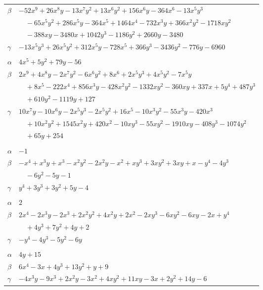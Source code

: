 \documentclass[11pt]{article}
\begin{document}
\begin{longtable}{@{}ll@{}}
$\beta$ & $-52x^{9}+26x^{8}y-13x^{7}y^{2}+13x^{6}y^{2}+156x^{6}y-364x^{6}-13x^{5}y^{3}$\\
 & $\quad -65x^{5}y^{2}+286x^{5}y-364x^{5}+1464x^{4}-732x^{3}y+366x^{2}y^{2}-1718xy^{2}$\\
 & $\quad -388xy-3480x+1042y^{3}-1186y^{2}+2660y-3480$\\
$\gamma$ & $-13x^{5}y^{3}+26x^{5}y^{2}+312x^{5}y-728x^{5}+366y^{3}-3436y^{2}-776y-6960$\\
\addlinespace[3pt]
\multicolumn{2}{@{}l}{$\{i,j\}=\{5,34\}$, $k_{ij}=2\cdot 3\cdot 5$}\\
$\alpha$ & $4x^{5}+5y^{2}+79y-56$\\
$\beta$ & $2x^{9}+4x^{8}y-2x^{7}y^{2}-6x^{6}y^{2}+8x^{6}+2x^{5}y^{3}+4x^{5}y^{2}-7x^{5}y$\\
 & $\quad +8x^{5}-222x^{4}+856x^{3}y-428x^{2}y^{2}-1332xy^{2}-360xy+337x+5y^{4}+487y^{3}$\\
 & $\quad +610y^{2}-1119y+127$\\
$\gamma$ & $10x^{7}y-10x^{6}y-2x^{5}y^{3}-2x^{5}y^{2}+16x^{5}-10x^{3}y^{2}-55x^{3}y-420x^{3}$\\
 & $\quad +10x^{2}y^{2}+1545x^{2}y+420x^{2}-10xy^{3}-55xy^{2}-1910xy-408y^{3}-1074y^{2}$\\
 & $\quad +65y+254$\\
\addlinespace[3pt]
\multicolumn{2}{@{}l}{$\{i,j\}=\{6,8\}$, $k_{ij}=5$}\\
$\alpha$ & $-1$\\
$\beta$ & $-x^{4}+x^{3}y+x^{3}-x^{2}y^{2}-2x^{2}y-x^{2}+xy^{3}+3xy^{2}+3xy+x-y^{4}-4y^{3}$\\
 & $\quad -6y^{2}-5y-1$\\
$\gamma$ & $y^{4}+3y^{3}+3y^{2}+5y-4$\\
\addlinespace[3pt]
\multicolumn{2}{@{}l}{$\{i,j\}=\{6,10\}$, $k_{ij}=2\cdot 3$}\\
$\alpha$ & $2$\\
$\beta$ & $2x^{4}-2x^{3}y-2x^{3}+2x^{2}y^{2}+4x^{2}y+2x^{2}-2xy^{3}-6xy^{2}-6xy-2x+y^{4}$\\
 & $\quad +4y^{3}+7y^{2}+4y+2$\\
$\gamma$ & $-y^{4}-4y^{3}-5y^{2}-6y$\\
\addlinespace[3pt]
\multicolumn{2}{@{}l}{$\{i,j\}=\{6,18\}$, $k_{ij}=3\cdot 17$}\\
$\alpha$ & $4y+15$\\
$\beta$ & $6x^{4}-3x+4y^{3}+13y^{2}+y+9$\\
$\gamma$ & $-4x^{3}y-9x^{3}+2x^{2}y-3x^{2}+4xy^{2}+11xy-3x+2y^{2}+14y-6$\\

\end{longtable}
\end{document}
